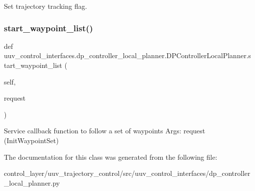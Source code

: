 \begin{DoxyVerb}Set trajectory tracking flag.\end{DoxyVerb}
 \mbox{\label{classuuv__control__interfaces_1_1dp__controller__local__planner_1_1DPControllerLocalPlanner_a46a25930563b91150b7c8282b028d7fa}} 
\subsubsection{\texorpdfstring{start\+\_\+waypoint\+\_\+list()}{start\_waypoint\_list()}}
{\footnotesize\ttfamily def uuv\+\_\+control\+\_\+interfaces.\+dp\+\_\+controller\+\_\+local\+\_\+planner.\+D\+P\+Controller\+Local\+Planner.\+start\+\_\+waypoint\+\_\+list (\begin{DoxyParamCaption}\item[{}]{self,  }\item[{}]{request }\end{DoxyParamCaption})}

\begin{DoxyVerb}Service callback function to follow a set of waypoints
Args:
    request (InitWaypointSet)
\end{DoxyVerb}
 

The documentation for this class was generated from the following file\+:\begin{DoxyCompactItemize}
\item 
control\+\_\+layer/uuv\+\_\+trajectory\+\_\+control/src/uuv\+\_\+control\+\_\+interfaces/dp\+\_\+controller\+\_\+local\+\_\+planner.\+py\end{DoxyCompactItemize}
